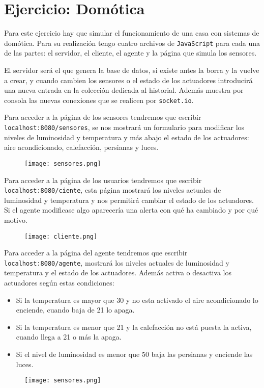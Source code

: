 \chapter{Ejercicio: Domótica}
Para este ejercicio hay que simular el funcionamiento de una casa con sistemas de domótica.
Para su realización tengo cuatro archivos de \texttt{JavaScript} para cada una de las partes:
el servidor, el cliente, el agente y la página que simula los sensores.

El servidor será el que genera la base de datos, si existe antes la borra y la vuelve a crear, y
cuando cambien los sensores o el estado de los actuadores introducirá una nueva entrada en
la colección dedicada al historial. Además muestra por consola las nuevas conexiones que se
realicen por \texttt{socket.io}.

Para acceder a la página de los sensores tendremos que escribir \texttt{localhost:8080/sensores},
se nos mostrará un formulario para modificar los niveles de luminosidad y temperatura y más
abajo el estado de los actuadores: aire acondicionado, calefacción, persianas y luces.

\begin{figure}[!ht]
	\begin{center}
		\texttt{[image: sensores.png]}
	\end{center}
\end{figure}

Para acceder a la página de los usuarios tendremos que escribir \texttt{localhost:8080/ciente},
esta página mostrará los niveles actuales de luminosidad y temperatura y nos permitirá cambiar
el estado de los actuadores. Si el agente modificase algo aparecería una alerta con qué ha
cambiado y por qué motivo.

\begin{figure}[!ht]
	\begin{center}
		\texttt{[image: cliente.png]}
	\end{center}
\end{figure}

Para acceder a la página del agente tendremos que escribir \texttt{localhost:8080/agente},
mostrará los niveles actuales de luminosidad y temperatura y el estado de los actuadores.
Además activa o desactiva los actuadores según estas condiciones:
\begin{itemize}
	\item Si la temperatura es mayor que 30 y no esta activado el aire acondicionado lo enciende, cuando baja de 21 lo apaga.
	\item Si la temperatura es menor que 21 y la calefacción no está puesta la activa, cuando llega a 21 o más la apaga.
	\item Si el nivel de luminosidad es menor que 50 baja las persianas y enciende las luces.
\end{itemize}

\begin{figure}[!ht]
	\begin{center}
		\texttt{[image: sensores.png]}
	\end{center}
\end{figure}
